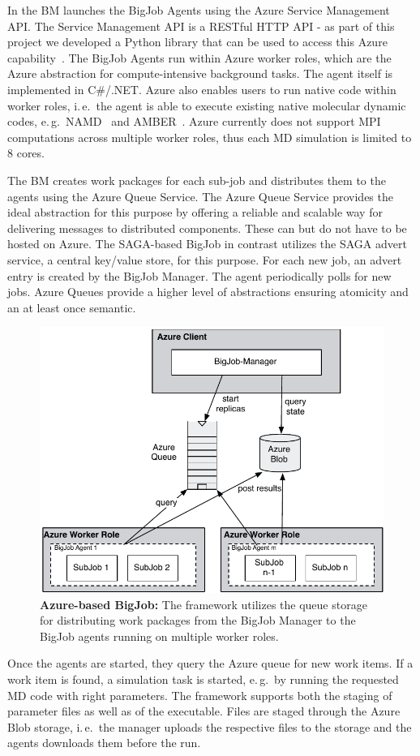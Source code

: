 \documentclass[conference,final]{IEEEtran}
\begin{document}
In the BM launches the BigJob Agents using the Azure Service Management API. 
The Service Management API is a RESTful HTTP API - as part of this project
we developed a Python library that can be used to access this Azure
capability~\cite{azure-service-python}. The BigJob Agents run within Azure 
worker roles, which are the Azure abstraction for compute-intensive 
background tasks. The agent itself is implemented in C\#/.NET. Azure 
also enables users to run native code within worker roles, i.\,e.\ 
the agent is able to execute existing native molecular dynamic codes, 
e.\,g.\ NAMD~\cite{Phillips:2005gd} and AMBER~\cite{cheatham-5}.  
Azure currently does not support MPI computations across multiple 
worker roles, thus each MD simulation is limited to 8 cores.


The BM creates work packages for each sub-job and distributes them 
to the agents using the Azure Queue Service. The Azure Queue Service provides 
the ideal abstraction for this purpose by offering a reliable and scalable 
way for delivering messages to distributed components. These can but do not
have to be hosted on Azure. The SAGA-based BigJob in contrast utilizes
the SAGA advert service, a central key/value store, for this purpose. 
For each new job, an advert entry is created by the BigJob Manager. 
The agent periodically polls for new jobs. Azure Queues provide a higher
level of abstractions ensuring atomicity and an at least once semantic.

\begin{figure}
    \centering
    \includegraphics[width=.4\textwidth]{figures/bigjob_azure}
    \caption{\textbf{Azure-based BigJob:} The framework
      utilizes the queue storage for distributing work
      packages from the BigJob Manager to the
      BigJob agents running on multiple worker roles.}
    \label{fig:figures_bigjob_azure}
\end{figure}

Once the agents are started, they query the Azure queue for new work items. 
If a work item is found, a simulation task is started, e.\,g.\ by running the requested
MD code with right parameters. The framework supports both the staging of 
parameter files as well as of the executable. Files are staged through the 
Azure Blob storage, i.\,e.\ the manager uploads the respective files
to the storage and the agents downloads them before the run.
\end{document}
